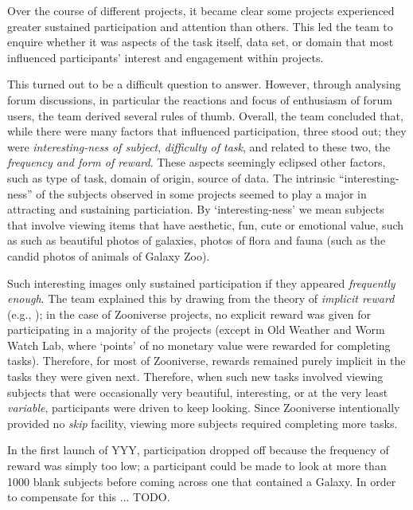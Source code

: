 \documentclass{sigchi}
\begin{document}
Over the course of different projects, it became clear some projects experienced greater sustained participation and attention than others.  This led the team to enquire whether it was aspects of the task itself, data set, or domain that most influenced participants' interest and engagement within projects.  

This turned out to be a difficult question to answer.  However, through analysing forum discussions, in particular the reactions and focus of enthusiasm of forum users, the team derived several rules of thumb. Overall, the team concluded that, while there were many factors that influenced participation, three stood out; they were \emph{interesting-ness of subject}, \emph{difficulty of task}, and related to these two, the \emph{frequency and form of reward}.  These aspects seemingly eclipsed other factors, such as type of task, domain of origin, source of data.  The intrinsic ``interesting-ness'' of the subjects observed in some projects seemed to play a major in attracting and sustaining particiation.  By `interesting-ness' we mean subjects that involve viewing items that have aesthetic, fun, cute or emotional value, such as such as beautiful photos of galaxies, photos of flora and fauna (such as the candid photos of animals of Galaxy Zoo).  

Such interesting images only sustained participation if they appeared \emph{frequently enough}.  The team explained this by drawing from the theory of \emph{implicit reward} (e.g., \cite{implicitreward}); in the case of Zooniverse projects, no explicit reward was given for participating in a majority of the projects (except in Old Weather and Worm Watch Lab, where `points' of no monetary value were rewarded for completing tasks).  Therefore, for most of Zooniverse, rewards remained purely implicit in the tasks they were given next.  Therefore, when such new tasks involved viewing subjects that were occasionally very beautiful, interesting, or at the very least \emph{variable}, participants were driven to keep looking.  Since Zooniverse intentionally provided no \emph{skip} facility, viewing more subjects required completing more tasks.

In the first launch of YYY, participation dropped off because the frequency of reward was simply too low; a participant could be made to look at more than 1000 blank subjects before coming across one that contained a Galaxy.  In order to compensate for this ... TODO.

\end{document}

